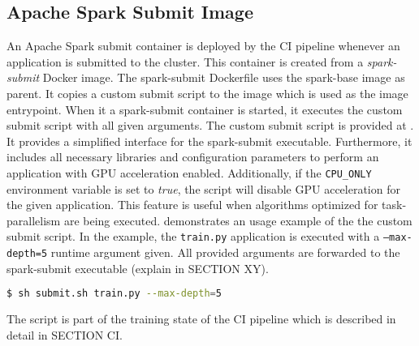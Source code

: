 \subsection{Apache Spark Submit Image}
An Apache Spark submit container is deployed by the CI pipeline whenever an application is submitted to the cluster. This container is created from a \textit{spark-submit} Docker image.
The spark-submit Dockerfile uses the spark-base image as parent.
It copies a custom submit script to the image which is used as the image entrypoint. When it a spark-submit container is started, it executes the custom submit script with all given arguments.
The custom submit script is provided at . It provides a simplified interface for the spark-submit executable. Furthermore, it includes all necessary libraries and configuration parameters to perform an application with GPU acceleration enabled. Additionally, if the \texttt{CPU\_ONLY} environment variable is set to \textit{true}, the script will disable GPU acceleration for the given application.
This feature is useful when algorithms optimized for task-parallelism are being executed.
 demonstrates an usage example of the the custom submit script.
In the example, the \texttt{train.py} application is executed with a \texttt{--max-depth=5} runtime argument given. All provided arguments are forwarded to the spark-submit executable (explain in SECTION XY). 
\begin{lstlisting}[label=lst:06_env_depl_submit, caption=Usage of the submit script, language=bash]
$ sh submit.sh train.py --max-depth=5
\end{lstlisting}
The script is part of the training state of the CI pipeline which is described in detail in SECTION CI.


